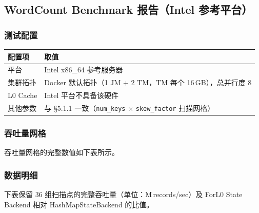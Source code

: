 \documentclass[a4paper,11pt]{article}
\newcommand{\project}{ForL0 State Backend}
\begin{document}
\subsection{WordCount Benchmark 报告（Intel 参考平台）}

\subsubsection{测试配置}

\begin{table}[H]
\centering
\small
\begin{tabularx}{\textwidth}{L{3.4cm} X}
\toprule
\textbf{配置项} & \textbf{取值} \\
\midrule
平台         & Intel x86\_64 参考服务器 \\
集群拓扑     & Docker 默认拓扑（1 JM + 2 TM，TM 每个 16\,GB），总并行度 8 \\
L0 Cache    & Intel 平台不具备该硬件 \\
其他参数     & 与 \S5.1.1 一致（\texttt{num\_keys} $\times$ \texttt{skew\_factor} 扫描网格） \\
\bottomrule
\end{tabularx}
\end{table}

\subsubsection{吞吐量网格}

吞吐量网格的完整数值如下表所示。

\subsubsection{数据明细}

下表保留 36 组扫描点的完整吞吐量（单位：M\,records/sec）及 \project{} 相对 HashMapStateBackend 的比值。
\end{document}
